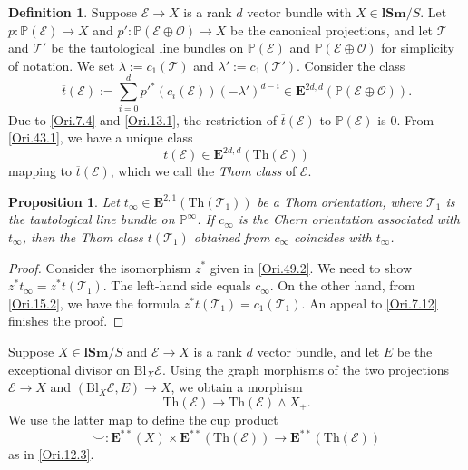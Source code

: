 \documentclass[11pt, a4paper]{amsart}
\newtheorem{prop}[thm]{Proposition}
\theoremstyle{definition}
\newtheorem{df}[thm]{Definition}
\numberwithin{equation}{subsection}
\renewcommand{\P}{\mathbb{P}}
\newcommand{\lSm}{\mathbf{lSm}}
\newcommand{\Blow}{{\mathrm{Bl}}}
\newcommand{\Thom}{\mathrm{Th}}
\newcommand{\ol}{\overline}
\newcommand{\cE}{\mathcal{E}}
\newcommand{\cO}{\mathcal{O}}
\newcommand{\cT}{\mathcal{T}}
\newcommand{\ringE}{\mathbf{E}}
\begin{document}
\begin{df}
\label{Ori.15}
Suppose $\cE\to X$ is a rank $d$ vector bundle with $X\in \lSm/S$.
Let $p\colon \P(\cE)\to X$ and $p'\colon \P(\cE\oplus \cO)\to X$ be the canonical projections, and let $\cT$ and $\cT'$ be the tautological line bundles on $\P(\cE)$ and $\P(\cE\oplus \cO)$ for simplicity of notation.
We set $\lambda:=c_1(\cT)$ and $\lambda':=c_1(\cT')$.
Consider the class
\begin{equation}
\label{Ori.15.2}
\ol{t}(\cE)
:=
\sum_{i=0}^d p'^* (c_i(\cE))(-\lambda')^{d-i} \in \ringE^{2d,d}(\P(\cE\oplus \cO)).
\end{equation}
Due to \eqref{Ori.7.4} and \eqref{Ori.13.1}, the restriction of $\ol{t}(\cE)$ to $\P(\cE)$ is $0$.
From \eqref{Ori.43.1}, we have a unique class
\[
t(\cE)\in \ringE^{2d,d}(\Thom(\cE))
\]
mapping to $\overline{t}(\cE)$, which we call the \emph{Thom class}\index[notation]{tE @ $t(\cE)$} of $\cE$.
\end{df}

\begin{prop}
\label{Ori.54}
Let $t_\infty \in \ringE^{2,1}(\Thom(\cT_1))$ be a Thom orientation, where $\cT_1$ is the tautological line bundle on $\P^\infty$.
If $c_\infty$ is the Chern orientation associated with $t_\infty$, then the Thom class $t(\cT_1)$ obtained from $c_\infty$ coincides with $t_\infty$.
\end{prop}
\begin{proof}
Consider the isomorphism $z^*$ given in \eqref{Ori.49.2}.
We need to show $z^*t_\infty=z^*t(\cT_1)$.
The left-hand side equals $c_\infty$.
On the other hand, 
from \eqref{Ori.15.2}, 
we have the formula $z^*t(\cT_1)=c_1(\cT_1)$.
An appeal to \eqref{Ori.7.12} finishes the proof.
\end{proof}

Suppose $X\in \lSm/S$ and $\cE\to X$ is a rank $d$ vector bundle, and let $E$ be the exceptional divisor on $\Blow_X \cE$.
Using the graph morphisms of the two projections $\cE\to X$ and $(\Blow_X\cE,E)\to X$, 
we obtain a morphism
\begin{equation}
\label{Ori.16.5}
\Thom(\cE)\to \Thom(\cE)\wedge X_+.
\end{equation}
We use the latter map to define the cup product
\[
\smile \colon \ringE^{**}(X)\times \ringE^{**}(\Thom(\cE))\to \ringE^{**}(\Thom(\cE))
\]
as in \eqref{Ori.12.3}.
\end{document}
